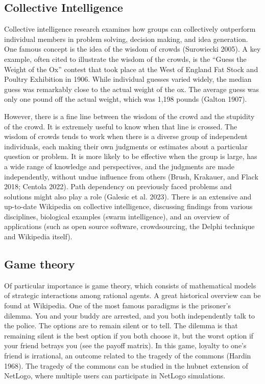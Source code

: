 \documentclass[
  a4paper,
  DIV=11,
  numbers=noendperiod]{scrreprt}
\begin{document}
\hypertarget{sec-Collective-Intelligence}{%
\subsection{Collective Intelligence}\label{sec-Collective-Intelligence}}

Collective intelligence research examines how groups can collectively
outperform individual members in problem solving, decision making, and
idea generation. One famous concept is the idea of the wisdom of crowds
(Surowiecki 2005). A key example, often cited to illustrate the wisdom
of the crowds, is the ``Guess the Weight of the Ox'' contest that took
place at the West of England Fat Stock and Poultry Exhibition in 1906.
While individual guesses varied widely, the median guess was remarkably
close to the actual weight of the ox. The average guess was only one
pound off the actual weight, which was 1,198 pounds (Galton 1907).

However, there is a fine line between the wisdom of the crowd and the
stupidity of the crowd. It is extremely useful to know when that line is
crossed. The wisdom of crowds tends to work when there is a diverse
group of independent individuals, each making their own judgments or
estimates about a particular question or problem. It is more likely to
be effective when the group is large, has a wide range of knowledge and
perspectives, and the judgments are made independently, without undue
influence from others (Brush, Krakauer, and Flack 2018; Centola 2022).
Path dependency on previously faced problems and solutions might also
play a role (Galesic et al. 2023). There is an extensive and up-to-date
Wikipedia on collective intelligence, discussing findings from various
disciplines, biological examples (swarm intelligence), and an overview
of applications (such as open source software, crowdsourcing, the Delphi
technique and Wikipedia itself).

\hypertarget{sec-Game-theory}{%
\subsection{Game theory}\label{sec-Game-theory}}

Of particular importance is game theory, which consists of mathematical
models of strategic interactions among rational agents. A great
historical overview can be found at Wikipedia. One of the most famous
paradigms is the prisoner's dilemma. You and your buddy are arrested,
and you both independently talk to the police. The options are to remain
silent or to tell. The dilemma is that remaining silent is the best
option if you both choose it, but the worst option if your friend
betrays you (see the payoff matrix). In this game, loyalty to one's
friend is irrational, an outcome related to the tragedy of the commons
(Hardin 1968). The tragedy of the commons can be studied in the hubnet
extension of NetLogo, where multiple users can participate in NetLogo
simulations.
\end{document}

